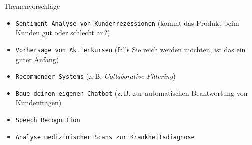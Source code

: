 \begin{dwHeaderFrame}{Themenvorschläge}
	\begin{itemize} 
		\item \texttt{Sentiment Analyse von Kundenrezessionen} (kommt das Produkt beim Kunden gut oder schlecht an?)
		\item \texttt{Vorhersage von Aktienkursen} (falls Sie reich werden möchten, ist das ein guter Anfang)
		\item \texttt{Recommender Systems} (z.\,B. \textit{Collaborative Filtering})
		\item \texttt{Baue deinen eigenen Chatbot} (z.\,B. zur automatischen Beantwortung von Kundenfragen)
		\item \texttt{Speech Recognition}
		\item \texttt{Analyse medizinischer Scans zur Krankheitsdiagnose}
	\end{itemize}
\end{dwHeaderFrame}

